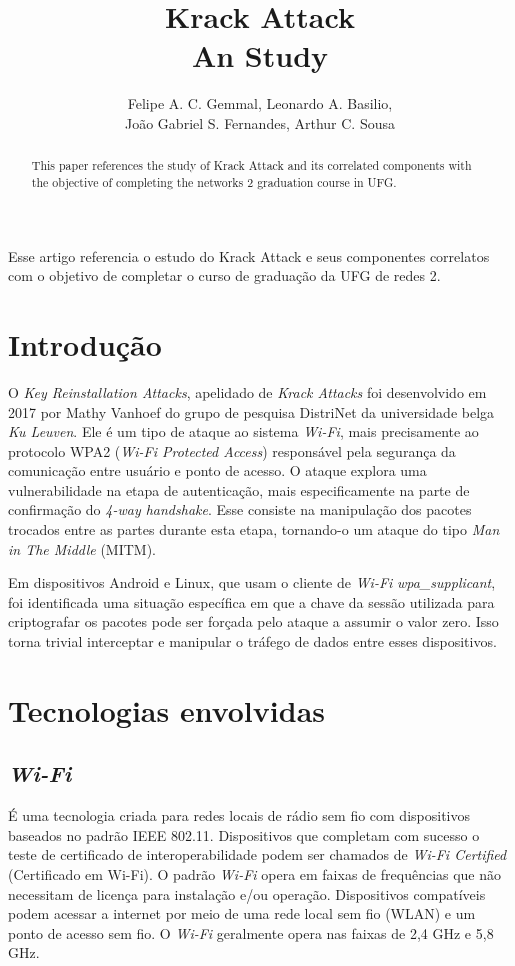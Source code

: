 \documentclass[12pt]{article}
\title{Krack Attack \\ An Study}
\author{Felipe A. C. Gemmal\inst{1}, Leonardo A. Basilio\inst{1},\\ João Gabriel S. Fernandes\inst{1}, Arthur C. Sousa\inst{1} }
\begin{document}
 

\maketitle

\begin{abstract}
	This paper references the study of Krack Attack and its correlated components with the objective of completing the networks 2 graduation course in UFG.
\end{abstract}

\begin{resumo} 
	Esse artigo referencia o estudo do Krack Attack e seus componentes correlatos com o objetivo de completar o curso de graduação da UFG de redes 2.
\end{resumo}


\section{Introdução}
O \textit{Key Reinstallation Attacks}, apelidado de \textit{Krack Attacks} \cite{1} foi desenvolvido em 2017 por Mathy Vanhoef do grupo de pesquisa DistriNet da universidade belga \textit{Ku Leuven}. Ele é um tipo de ataque ao sistema \textit{Wi-Fi}, mais precisamente ao protocolo WPA2 (\textit{Wi-Fi Protected Access}) responsável pela segurança da comunicação entre usuário e ponto de acesso. O ataque explora uma vulnerabilidade na etapa de autenticação, mais especificamente na parte de confirmação do \textit{4-way handshake}. Esse consiste na manipulação dos pacotes trocados entre as partes durante esta etapa, tornando-o um ataque do tipo \textit{Man in The Middle} (MITM).

Em dispositivos Android e Linux, que usam o cliente de \textit{Wi-Fi} \textit{wpa\_supplicant}, foi identificada uma situação específica em que a chave da sessão utilizada para criptografar os pacotes pode ser forçada pelo ataque a assumir o valor zero. Isso torna trivial interceptar e manipular o tráfego de dados entre esses dispositivos.

\section{Tecnologias envolvidas}
\subsection{\textit{Wi-Fi}}
É uma tecnologia criada para redes locais de rádio sem fio com dispositivos baseados no padrão IEEE 802.11. Dispositivos que completam com sucesso o teste de certificado de interoperabilidade podem ser chamados de \textit{Wi-Fi Certified} (Certificado em Wi-Fi). O padrão \textit{Wi-Fi} opera em faixas de frequências que não necessitam de licença para instalação e/ou operação. Dispositivos compatíveis podem acessar a internet por meio de uma rede local sem fio (WLAN) e um ponto de acesso sem fio. O \textit{Wi-Fi} geralmente opera nas faixas de 2,4 GHz e 5,8 GHz.
\end{document}
